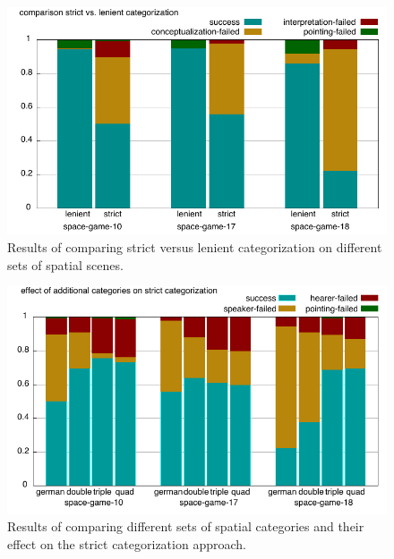 \begin{figure}
\begin{center}
\includegraphics[width=1\columnwidth]{figs/apply-filter-comparison}
\end{center}
\caption[Comparison of filter type semantics and apply semantics]
{Results of comparing strict versus lenient categorization
on different sets of spatial scenes.}
\label{f:apply-filter-comparison}
\end{figure}


\begin{figure}
\begin{center}
\includegraphics[width=1\columnwidth]{figs/filter-more-categories.pdf}
\end{center}
\caption[Effect of additional categories on strict categorization]
{Results of comparing different sets of spatial categories and their 
effect on the strict categorization approach.}
\label{f:filter-increased-categories}
\end{figure}

